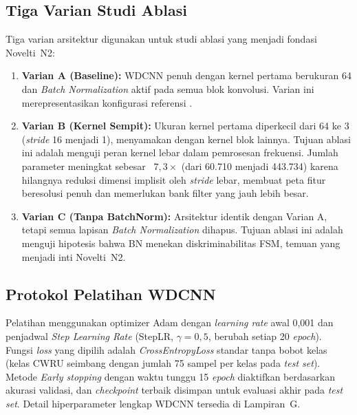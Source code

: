 \subsection{Tiga Varian Studi Ablasi}
\label{subsec:bab4_wdcnn_ablasi}

Tiga varian arsitektur digunakan untuk studi ablasi yang menjadi fondasi
Novelti~N2:

\begin{enumerate}
  \item \textbf{Varian A (Baseline):} WDCNN penuh dengan kernel pertama
        berukuran 64 dan \emph{Batch Normalization} aktif pada semua blok
        konvolusi. Varian ini merepresentasikan konfigurasi referensi
        .
  \item \textbf{Varian B (Kernel Sempit):} Ukuran kernel pertama diperkecil
        dari 64 ke 3 {\color{blue}(\emph{stride} 16 menjadi 1)},
        menyamakan dengan kernel blok lainnya. Tujuan ablasi
        ini adalah menguji peran kernel lebar dalam pemrosesan frekuensi.
        {\color{blue}Jumlah parameter meningkat sebesar \
        $7{,}3\times$ (dari 60.710 menjadi 443.734) karena hilangnya
        reduksi dimensi implisit oleh \emph{stride} lebar, membuat peta fitur
        beresolusi penuh dan memerlukan bank filter yang jauh lebih besar.}
  \item \textbf{Varian C (Tanpa BatchNorm):} Arsitektur identik dengan
        Varian A, tetapi semua lapisan \emph{Batch Normalization} dihapus.
        Tujuan ablasi ini adalah menguji hipotesis bahwa BN menekan
        diskriminabilitas FSM, temuan yang menjadi inti Novelti~N2.
\end{enumerate}

\subsection{Protokol Pelatihan WDCNN}
\label{subsec:bab4_wdcnn_training}

Pelatihan menggunakan optimizer Adam dengan \emph{learning rate} awal 0,001
dan penjadwal \emph{Step Learning Rate} (StepLR, $\gamma = 0{,}5$, berubah
setiap 20 \emph{epoch}).
Fungsi \emph{loss} yang dipilih adalah \emph{CrossEntropyLoss} standar tanpa bobot kelas
(kelas CWRU seimbang dengan jumlah 75 sampel per kelas pada \emph{test set}).
Metode \emph{Early stopping} dengan waktu tunggu 15 \emph{epoch} diaktifkan berdasarkan
akurasi validasi, dan \emph{checkpoint} terbaik disimpan untuk evaluasi
akhir pada \emph{test set}.
Detail hiperparameter lengkap WDCNN tersedia di Lampiran~G.

